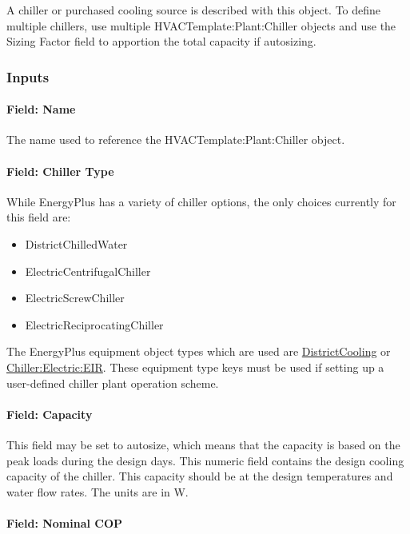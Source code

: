 A chiller or purchased cooling source is described with this object. To define multiple chillers, use multiple HVACTemplate:Plant:Chiller objects and use the Sizing Factor field to apportion the total capacity if autosizing.

\subsubsection{Inputs}\label{inputs-24-000}

\paragraph{Field: Name}\label{field-name-11-005}

The name used to reference the HVACTemplate:Plant:Chiller object.

\paragraph{Field: Chiller Type}\label{field-chiller-type}

While EnergyPlus has a variety of chiller options, the only choices currently for this field are:

\begin{itemize}
\item
  DistrictChilledWater
\item
  ElectricCentrifugalChiller
\item
  ElectricScrewChiller
\item
  ElectricReciprocatingChiller
\end{itemize}

The EnergyPlus equipment object types which are used are \hyperref[districtcooling]{DistrictCooling} or \hyperref[chillerelectriceir]{Chiller:Electric:EIR}. These equipment type keys must be used if setting up a user-defined chiller plant operation scheme.

\paragraph{Field: Capacity}\label{field-capacity}

This field may be set to autosize, which means that the capacity is based on the peak loads during the design days. This numeric field contains the design cooling capacity of the chiller. This capacity should be at the design temperatures and water flow rates. The units are in W.

\paragraph{Field: Nominal COP}\label{field-nominal-cop}

